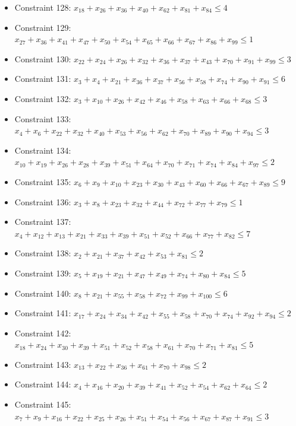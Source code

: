\documentclass[11pt]{article}
\begin{document}
\begin{itemize}
\item Constraint 128: $x_{18} + x_{26} + x_{36} + x_{40} + x_{62} + x_{81} + x_{84} \le 4$
\item Constraint 129: $x_{27} + x_{36} + x_{41} + x_{47} + x_{50} + x_{54} + x_{65} + x_{66} + x_{67} + x_{86} + x_{99} \le 1$
\item Constraint 130: $x_{22} + x_{24} + x_{26} + x_{32} + x_{36} + x_{37} + x_{43} + x_{70} + x_{91} + x_{99} \le 3$
\item Constraint 131: $x_{3} + x_{4} + x_{21} + x_{36} + x_{37} + x_{56} + x_{58} + x_{74} + x_{90} + x_{91} \le 6$
\item Constraint 132: $x_{3} + x_{10} + x_{26} + x_{42} + x_{46} + x_{58} + x_{63} + x_{66} + x_{68} \le 3$
\item Constraint 133: $x_{4} + x_{6} + x_{22} + x_{32} + x_{40} + x_{53} + x_{56} + x_{62} + x_{70} + x_{89} + x_{90} + x_{94} \le 3$
\item Constraint 134: $x_{10} + x_{19} + x_{26} + x_{28} + x_{39} + x_{51} + x_{64} + x_{70} + x_{71} + x_{74} + x_{84} + x_{97} \le 2$
\item Constraint 135: $x_{6} + x_{9} + x_{10} + x_{23} + x_{30} + x_{43} + x_{60} + x_{66} + x_{67} + x_{89} \le 9$
\item Constraint 136: $x_{3} + x_{8} + x_{23} + x_{32} + x_{44} + x_{72} + x_{77} + x_{79} \le 1$
\item Constraint 137: $x_{4} + x_{12} + x_{13} + x_{21} + x_{33} + x_{39} + x_{51} + x_{52} + x_{66} + x_{77} + x_{82} \le 7$
\item Constraint 138: $x_{2} + x_{21} + x_{37} + x_{42} + x_{53} + x_{81} \le 2$
\item Constraint 139: $x_{5} + x_{19} + x_{21} + x_{47} + x_{49} + x_{74} + x_{80} + x_{84} \le 5$
\item Constraint 140: $x_{8} + x_{21} + x_{55} + x_{58} + x_{72} + x_{99} + x_{100} \le 6$
\item Constraint 141: $x_{17} + x_{24} + x_{34} + x_{42} + x_{55} + x_{58} + x_{70} + x_{74} + x_{92} + x_{94} \le 2$
\item Constraint 142: $x_{18} + x_{24} + x_{30} + x_{39} + x_{51} + x_{52} + x_{58} + x_{61} + x_{70} + x_{71} + x_{81} \le 5$
\item Constraint 143: $x_{13} + x_{22} + x_{36} + x_{61} + x_{70} + x_{98} \le 2$
\item Constraint 144: $x_{4} + x_{16} + x_{20} + x_{39} + x_{41} + x_{52} + x_{54} + x_{62} + x_{64} \le 2$
\item Constraint 145: $x_{7} + x_{9} + x_{16} + x_{22} + x_{25} + x_{26} + x_{51} + x_{54} + x_{56} + x_{67} + x_{87} + x_{91} \le 3$

\end{itemize}
\end{document}
